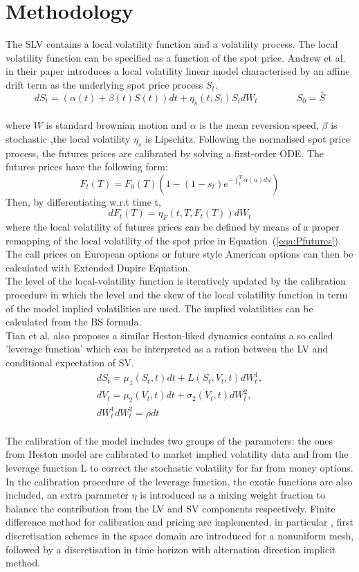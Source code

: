 \documentclass[12pt, a4paper]{article}
\begin{document}
\section*{Methodology}
The SLV contains a local volatility function and a volatility process. The local volatility function can be specified as a function of the spot price. Andrew et al. ~\cite{Andrea2018}  in their paper introduces a local volatility linear model characterised by an affine drift term as the underlying spot price process $S_t$. 
\begin {equation}
\label{eqa:Pfutures}
d S_t = (\alpha(t)+\beta(t) S(t)) dt +\eta_{s}(t,S_{t}) S_t d W_t \quad\quad\qquad S_0 = \bar{S}
\end{equation}\\
where $W$ is standard brownian motion and $\alpha$ is the mean reversion speed, $\beta$ is stochastic ,the local volatility $\eta_s$ is Lipschitz. Following the normalised spot price process, the futures prices are calibrated by solving a first-order ODE. The futures prices have the following form:
\begin {equation}
F_t(T) = F_0(T) (1-(1-s_t)e^{-\int_{t}^{T} \alpha(u)du})
\end{equation}
Then, by differentiating w.r.t time t,
\begin {equation}
dF_t(T) = \eta_F(t,T,F_t(T))dW_t
\end{equation}
where the local volatility of futures prices can be defined by means of a proper remapping of the local volatility of the spot price in Equation~(\ref{eqa:Pfutures}).
The call prices on European options or future style American options can then be calculated with Extended Dupire Equation.\\ 
 The level of the local-volatility function is iteratively updated by the calibration procedure in which the level and the skew of the local volatility function in term of the model implied volatilities are used. The implied volatilities can be calculated from the BS formula.\\
Tian et al. \cite{Tian2015} also proposes a similar Heston-liked dynamics contains a so called 'leverage function' which can be interpreted as a ration between the LV and conditional expectation of SV.
\begin{gather*}
dS_t = \mu_1(S_t,t)dt+L(S_t,V_t,t)dW_t^1,\\
dV_t = \mu_2(V_t,t)dt +\sigma_2(V_t,t)dW_t^2,\\
dW_t^1 dW_t^2 =  \rho dt 
\end{gather*}\\
The calibration of the model includes two groups of the parameters: the ones from Heston model are calibrated to market implied volatility data and from the leverage function L to correct the stochastic volatility for far from money options. In the calibration procedure of the leverage function, the exotic functions are also included, an extra parameter $\eta $ is introduced as a mixing weight fraction to balance the contribution from the LV and SV components respectively. Finite difference method for calibration and pricing are implemented, in particular , first discretisation schemes in the space domain are introduced for a nonuniform mesh, followed by a discretisation in time horizon with alternation direction implicit method. 
\end{document}
